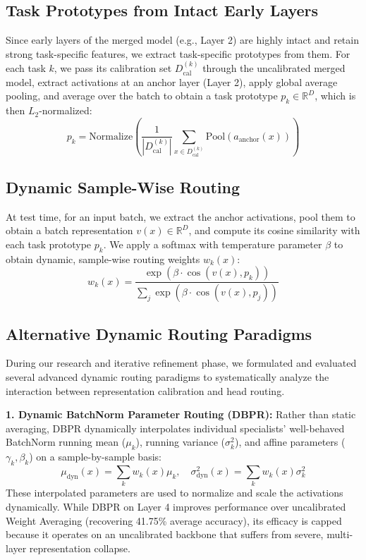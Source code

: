 \documentclass{article}
\theoremstyle{plain}
\theoremstyle{definition}
\theoremstyle{remark}
\begin{document}
\subsection{Task Prototypes from Intact Early Layers}
Since early layers of the merged model (e.g., Layer 2) are highly intact and retain strong task-specific features, we extract task-specific prototypes from them. For each task $k$, we pass its calibration set $D_{\text{cal}}^{(k)}$ through the uncalibrated merged model, extract activations at an anchor layer (Layer 2), apply global average pooling, and average over the batch to obtain a task prototype $p_k \in \mathbb{R}^D$, which is then $L_2$-normalized:
\begin{equation}
  p_k = \text{Normalize}\left( \frac{1}{|D_{\text{cal}}^{(k)}|} \sum_{x \in D_{\text{cal}}^{(k)}} \text{Pool}(a_{\text{anchor}}(x)) \right)
\end{equation}

\subsection{Dynamic Sample-Wise Routing}
At test time, for an input batch, we extract the anchor activations, pool them to obtain a batch representation $v(x) \in \mathbb{R}^D$, and compute its cosine similarity with each task prototype $p_k$. We apply a softmax with temperature parameter $\beta$ to obtain dynamic, sample-wise routing weights $w_k(x)$:
\begin{equation}
  w_k(x) = \frac{\exp(\beta \cdot \cos(v(x), p_k))}{\sum_{j} \exp(\beta \cdot \cos(v(x), p_j))}
\end{equation}

\subsection{Alternative Dynamic Routing Paradigms}
During our research and iterative refinement phase, we formulated and evaluated several advanced dynamic routing paradigms to systematically analyze the interaction between representation calibration and head routing.

\textbf{1. Dynamic BatchNorm Parameter Routing (DBPR):} Rather than static averaging, DBPR dynamically interpolates individual specialists' well-behaved BatchNorm running mean ($\mu_k$), running variance ($\sigma^2_k$), and affine parameters ($\gamma_k, \beta_k$) on a sample-by-sample basis:
\begin{equation}
  \mu_{\text{dyn}}(x) = \sum_k w_k(x) \mu_k, \quad \sigma^2_{\text{dyn}}(x) = \sum_k w_k(x) \sigma^2_k
\end{equation}
These interpolated parameters are used to normalize and scale the activations dynamically. While DBPR on Layer 4 improves performance over uncalibrated Weight Averaging (recovering 41.75\% average accuracy), its efficacy is capped because it operates on an uncalibrated backbone that suffers from severe, multi-layer representation collapse.
\end{document}
